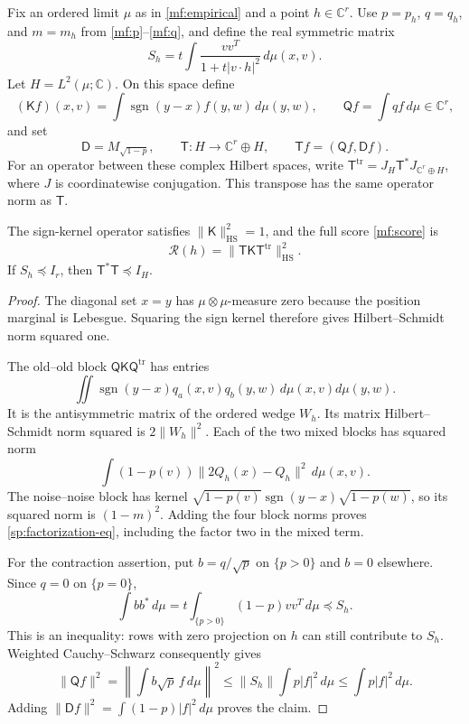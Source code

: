 Fix an ordered limit \(\mu\) as in \eqref{mf:empirical} and a point
\(h\in\mathbb C^r\). Use \(p=p_h\), \(q=q_h\), and \(m=m_h\)
from \eqref{mf:p}--\eqref{mf:q}, and define the real symmetric matrix
\begin{equation}\label{sp:covariance-resolvent}
 S_h=t\int\frac{vv^T}{1+t|v\cdot h|^2}\,d\mu(x,v).
\end{equation}
Let \(H=L^2(\mu;\mathbb C)\). On this space define
\[
 (\mathsf Kf)(x,v)=\int\operatorname{sgn}(y-x)f(y,w)\,d\mu(y,w),
 \qquad \mathsf Qf=\int qf\,d\mu\in\mathbb C^r,
\]
and set
\[
 \mathsf D=M_{\sqrt{1-p}},\qquad
 \mathsf T:H\longrightarrow\mathbb C^r\oplus H,
 \qquad \mathsf Tf=(\mathsf Qf,\mathsf Df).
\]
For an operator between these complex Hilbert spaces, write
\(\mathsf T^{\mathrm{tr}}=J_H\mathsf T^*J_{\mathbb C^r\oplus H}\),
where \(J\) is coordinatewise conjugation. This transpose has the same
operator norm as \(\mathsf T\).

\begin{lemma}\label{sp:factorization}
The sign-kernel operator satisfies \(\|\mathsf K\|_{\mathrm{HS}}^2=1\),
and the full score \eqref{mf:score} is
\begin{equation}\label{sp:factorization-eq}
 \mathcal R(h)=
 \|\mathsf T\mathsf K\mathsf T^{\mathrm{tr}}\|_{\mathrm{HS}}^2.
\end{equation}
If \(S_h\preceq I_r\), then \(\mathsf T^*\mathsf T\preceq I_H\).
\end{lemma}
\begin{proof}
The diagonal set \(x=y\) has \(\mu\otimes\mu\)-measure zero because
the position marginal is Lebesgue. Squaring the sign kernel therefore
gives Hilbert--Schmidt norm squared one.

The old--old block \(\mathsf Q\mathsf K\mathsf Q^{\mathrm{tr}}\)
has entries
\[
 \iint\operatorname{sgn}(y-x)q_a(x,v)q_b(y,w)\,d\mu(x,v)d\mu(y,w).
\]
It is the antisymmetric matrix of the ordered wedge \(W_h\). Its
matrix Hilbert--Schmidt norm squared is \(2\|W_h\|^2\).
Each of the two mixed blocks has squared norm
\[
 \int(1-p(v))\|2Q_h(x)-Q_h\|^2\,d\mu(x,v).
\]
The noise--noise block has kernel
\(\sqrt{1-p(v)}\operatorname{sgn}(y-x)\sqrt{1-p(w)}\), so its
squared norm is \((1-m)^2\). Adding the four block norms proves
\eqref{sp:factorization-eq}, including the factor two in the mixed term.

For the contraction assertion, put \(b=q/\sqrt p\) on \(\{p>0\}\)
and \(b=0\) elsewhere. Since \(q=0\) on \(\{p=0\}\),
\[
 \int bb^*\,d\mu
 =t\int_{\{p>0\}}(1-p)vv^T\,d\mu\preceq S_h.
\]
This is an inequality: rows with zero projection on \(h\) can still
contribute to \(S_h\). Weighted Cauchy--Schwarz consequently gives
\[
 \|\mathsf Qf\|^2
 =\left\|\int b\sqrt p\,f\,d\mu\right\|^2
 \le\|S_h\|\int p|f|^2\,d\mu
 \le\int p|f|^2\,d\mu.
\]
Adding \(\|\mathsf Df\|^2=\int(1-p)|f|^2\,d\mu\) proves the claim.
\end{proof}

